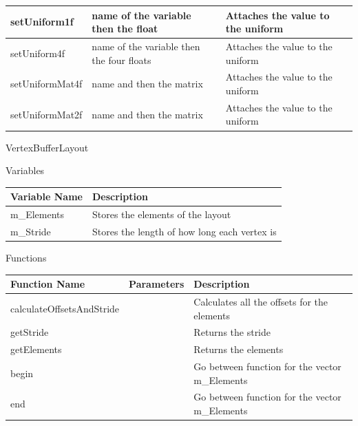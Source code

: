\documentclass{article}
\begin{document}
\begin{center}
\begin{tabular}{ | m{} | m{}| m{} | }
                        \hline
                        setUniform1f & name of the variable then the float & Attaches the value to the uniform \\
                        \hline
                        setUniform4f & name of the variable then the four floats & Attaches the value to the uniform \\
                        \hline
                        setUniformMat4f & name and then the matrix & Attaches the value to the uniform \\
                        \hline
                        setUniformMat2f & name and then the matrix & Attaches the value to the uniform \\
                        \hline
                    \end{tabular}
                \end{center}
                VertexBufferLayout
                \begin{center}
                    Variables
                    \begin{tabular}{ | m{} | m{} | }
                        \hline
                        \textbf{Variable Name} & \textbf{Description} \\
                        \hline
                        m\_Elements & Stores the elements of the layout \\
                        \hline
                        m\_Stride & Stores the length of how long each vertex is \\
                        \hline
                    \end{tabular}
                    Functions
                    \begin{tabular}{ | m{} | m{}| m{} | }
                        \hline
                        \textbf{Function Name} & \textbf{Parameters} & \textbf{Description} \\
                        \hline
                        calculateOffsetsAndStride & & Calculates all the offsets for the elements \\
                        \hline
                        getStride & & Returns the stride \\
                        \hline
                        getElements & & Returns the elements \\
                        \hline
                        begin & & Go between function for the vector m\_Elements \\
                        \hline
                        end & & Go between function for the vector m\_Elements \\
                        \hline
                    \end{tabular}
                \end{center}
\end{document}
